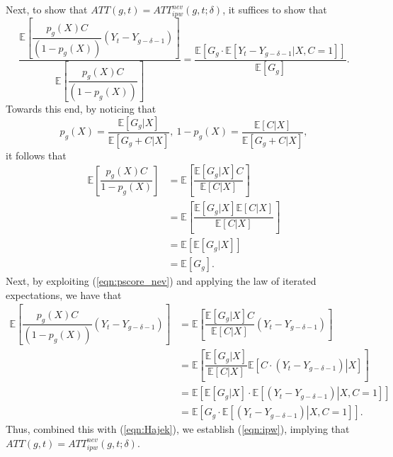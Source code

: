 \documentclass[11pt]{article}%
\theoremstyle{plain}
\numberwithin{sassumption}{section}
\numberwithin{equation}{section}
\begin{document}
{\small Next, to show that $ATT(g,t)=ATT_{ipw}^{nev}\left(  g,t;\delta\right)
$, it suffices to show that
\begin{equation}
\frac{\mathbb{E}\left[  \dfrac{p_{g}\left(  X\right)  C}{(1-p_{g}(X))}%
(Y_{t}-Y_{g-\delta-1})\right]  }{\mathbb{E}\left[  \dfrac{p_{g}\left(
X\right)  C}{(1-p_{g}(X))}\right]  }=\frac{\mathbb{E}\left[  G_{g}%
\cdot\mathbb{E}[Y_{t}-Y_{g-\delta-1}|X,C=1]\right]  }{\mathbb{E}\left[
G_{g}\right]  }. \label{eqn:ipw}%
\end{equation}
Towards this end, by noticing that%
\begin{equation}
p_{g}\left(  X\right)  =\frac{\mathbb{E}\left[  G_{g}|X\right]  }%
{\mathbb{E}\left[  G_{g}+C|X\right]  },~1-p_{g}\left(  X\right)
=\frac{\mathbb{E}\left[  C|X\right]  }{\mathbb{E}\left[  G_{g}+C|X\right]  },
\label{eqn:pscore_nev}%
\end{equation}
it follows that%
\begin{align}
\mathbb{E}\left[  \dfrac{p_{g}\left(  X\right)  C}{1-p_{g}(X)}\right]   &
=\mathbb{E}\left[  \dfrac{\mathbb{E}\left[  G_{g}|X\right]  C}%
{\mathbb{E}\left[  C|X\right]  }\right] \nonumber\\
&  =\mathbb{E}\left[  \dfrac{\mathbb{E}\left[  G_{g}|X\right]  \mathbb{E}%
\left[  C|X\right]  }{\mathbb{E}\left[  C|X\right]  }\right] \nonumber\\
&  =\mathbb{E}\left[  \mathbb{E}\left[  G_{g}|X\right]  \right] \nonumber\\
&  =\mathbb{E}\left[  G_{g}\right]  . \label{eqn:Hajek}%
\end{align}
Next, by exploiting (\ref{eqn:pscore_nev}) and applying the law of iterated
expectations, we have that%
\begin{align*}
\mathbb{E}\left[  \dfrac{p_{g}\left(  X\right)  C}{(1-p_{g}(X))}%
(Y_{t}-Y_{g-\delta-1})\right]   &  =\mathbb{E}\left[  \dfrac{\mathbb{E}\left[
G_{g}|X\right]  C}{\mathbb{E}\left[  C|X\right]  }(Y_{t}-Y_{g-\delta
-1})\right] \\
&  =\mathbb{E}\left[  \dfrac{\mathbb{E}\left[  G_{g}|X\right]  }%
{\mathbb{E}\left[  C|X\right]  }\mathbb{E}\left[  \left.  C\cdot
(Y_{t}-Y_{g-\delta-1})\right\vert X\right]  \right] \\
&  =\mathbb{E}\left[  \mathbb{E}\left[  G_{g}|X\right]  \cdot\mathbb{E}\left[
\left.  (Y_{t}-Y_{g-\delta-1})\right\vert X,C=1\right]  \right] \\
&  =\mathbb{E}\left[  G_{g}\cdot\mathbb{E}\left[  \left.  (Y_{t}%
-Y_{g-\delta-1})\right\vert X,C=1\right]  \right]  .
\end{align*}
Thus, combined this with (\ref{eqn:Hajek}), we establish (\ref{eqn:ipw}),
implying that $ATT(g,t)=ATT_{ipw}^{nev}\left(  g,t;\delta\right)  $. }
\end{document}
